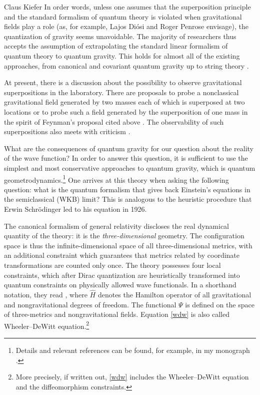 \begin{artengenv}{Claus Kiefer}
In order words, unless one assumes that the superposition principle
and the standard formalism of quantum theory is violated when
gravitational fields play a role (as, for example, Lajos Di\'osi and
Roger Penrose 
envisage), the quantization of gravity seems unavoidable. The majority
of researchers thus accepts the assumption of 
extrapolating the standard linear formalism of quantum theory to
quantum gravity. This holds for almost all of the existing approaches,
from canonical and covariant quantum gravity up to string theory
\parencite{kiefer_quantum_2012}.

At present, there is a discussion about the possibility to observe
gravitational superpositions in the laboratory. There are proposals
to probe a nonclassical gravitational field generated by
two masses each of which is superposed at two locations
\parencite[see e.g.][]{marletto_witness_2017}
or to probe such a field generated by the superposition
of one mass in the spirit of Feynman's proposal cited above
\parencite[see e.g. the remarks in][]{schmole_micromechanical_2016}.
The
observability of such superpositions also meets with criticism 
\parencite{anastopoulos_comment_2018}.

What are the consequences of quantum gravity for our question about the
reality of the wave function? In order to answer this question, it is
sufficient to use the simplest and most conservative approaches to
quantum gravity, which is quantum geometrodynamics.\footnote{Details
  and relevant references can be found, for example, in my monograph
  \parencite{kiefer_quantum_2012}.} One arrives at this theory when asking the
following question: what is the quantum formalism that gives back
Einstein's equations in the semiclassical (WKB) limit? This is analogous
to the heuristic procedure that Erwin Schr\"odinger led to his
equation in 1926.

The canonical formalism of general relativity discloses the real
dynamical quantity of the theory: it is the {\em three-dimensional}
geometry. The configuration space is thus the infinite-dimensional
space of all three-dimensional metrics, with an additional constraint
which guarantees that metrics related by coordinate transformations are
counted only once. The theory possesses four local constraints, which
after Dirac quantization are heuristically transformed into quantum
constraints on physically allowed wave functionals. 
In a shorthand notation, they read
\be
\label {wdw}
,
\ee
where $\hat{H}$ denotes the Hamilton operator of all gravitational and
nongravitational degrees of freedom. The functional $\Psi$ is defined
on the space of three-metrics and nongravitational fields. Equation
\eqref{wdw} is also called Wheeler--DeWitt equation.\footnote{More
  precisely, if written out, \eqref{wdw} includes the Wheeler--DeWitt
  equation and the diffeomorphism constraints.} 


\end{artengenv}

